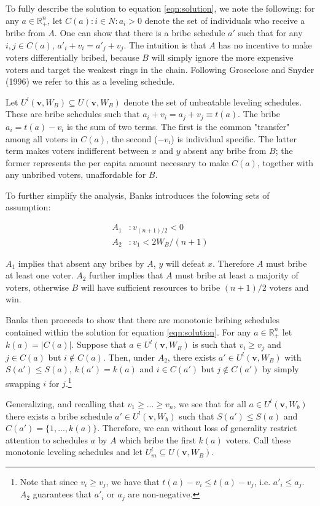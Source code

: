 \documentclass[12pt,a4paper]{article}
\newcommand{\real}{\mathbb{R}_+^n}
\begin{document}
To fully describe the solution to equation \ref{eqn:solution}, we note the following: for any $a \in \mathbb{R}_+^n$, let $C(a) : {i \in N : a_i > 0}$ denote the set of individuals who receive a bribe from $A$. One can show that there is a bribe schedule $a'$ such that for any $i,j \in C(a)$, $a'_i + v_i = a'_j + v_j$. The intuition is that $A$ has no incentive to make voters differentially bribed, because $B$ will simply ignore the more expensive voters and target the weakest rings in the chain. Following Groseclose and Snyder (1996) we refer to this as a leveling schedule.

Let $U^l(\mathbf{v}, W_B) \subseteq U(\mathbf{v}, W_B)$ denote the set of unbeatable leveling schedules. These are bribe schedules such that $a_i + v_i = a_j + v_j  \equiv t(a)$. The bribe $a_i = t(a) - v_i$ is the sum of two terms. The first is the common "transfer" among all voters in $C(a)$, the second ($-v_i$) is individual specific. The latter term makes voters indifferent between $x$ and $y$ absent any bribe from $B$; the former represents the per capita amount necessary to make $C(a)$, together with any unbribed voters, unaffordable for $B$.

To further simplify the analysis, Banks introduces the folowing sets of assumption:

\begin{align*}
    A_1 &: v_{(n+1)/2} < 0\\
    A_2 &: v_1 < 2W_B/(n+1) 
\end{align*}

$A_1$ implies that absent any bribes by $A$, $y$ will defeat $x$. Therefore $A$ must bribe at least one voter. $A_2$ further implies that $A$ must bribe at least a majority of voters, otherwise $B$ will have sufficient resources to bribe $(n+1)/2$ voters and win.

Banks then proceeds to show that there are monotonic bribing schedules contained within the solution for equation \ref{eqn:solution}. For any $a \in \real$ let $k(a) = \lvert C(a) \rvert$. Suppose that $a\in U^l(\mathbf{v}, W_B)$ is such that $v_i \geq v_j$ and $j \in C(a)$ but $i \notin C(a)$. Then, under $A_2$, there exists $a' \in U^l(\mathbf{v}, W_B)$ with $S(a') \leq S(a)$, $k(a') = k(a)$ and $i \in C(a')$ but $j \notin C(a')$ by simply swapping $i$ for $j$.\footnote{Note that since $v_i \geq v_j$, we have that $t(a) - v_i \leq  t(a) - v_j$, i.e. $a'_i \leq a_j$. $A_2$ guarantees that $a'_i$ or $a_j$ are non-negative.}

Generalizing, and recalling that $v_1 \geq ... \geq v_n$, we see that for all $a \in U^l(\mathbf{v}, W_b)$ there exists a bribe schedule $a' \in U^l(\mathbf{v}, W_b)$ such that $S(a') \leq S(a)$ and $C(a') = \{1, ..., k(a)\}$. Therefore, we can without loss of generality restrict attention to schedules $a$ by $A$ which bribe the first $k(a)$ voters. Call these monotonic leveling schedules and let $U_m^l \subseteq U(\mathbf{v}, W_B)$.
\end{document}
